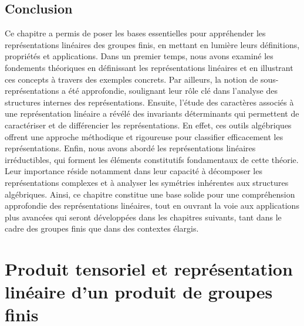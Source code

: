 \documentclass[a4paper, 14pt]{report}
\newcommand{\applyfontsize}{%
	\fontsize{12}{12}\selectfont
}
\begin{document}
\begin{onehalfspace}
{			\section*{Conclusion}
			Ce chapitre a permis de poser les bases essentielles pour appréhender les représentations linéaires des groupes finis, en mettant en lumière leurs définitions, propriétés et applications. Dans un premier temps, nous avons examiné les fondements théoriques en définissant les représentations linéaires et en illustrant ces concepts à travers des exemples concrets. Par ailleurs, la notion de sous-représentations a été approfondie, soulignant leur rôle clé dans l’analyse des structures internes des représentations.
			Ensuite, l’étude des caractères associés à une représentation linéaire a révélé des invariants déterminants qui permettent de caractériser et de différencier les représentations. En effet, ces outils algébriques offrent une approche méthodique et rigoureuse pour classifier efficacement les représentations.
			Enfin, nous avons abordé les représentations linéaires irréductibles, qui forment les éléments constitutifs fondamentaux de cette théorie. Leur importance réside notamment dans leur capacité à décomposer les représentations complexes et à analyser les symétries inhérentes aux structures algébriques.
			Ainsi, ce chapitre constitue une base solide pour une compréhension approfondie des représentations linéaires, tout en ouvrant la voie aux applications plus avancées qui seront développées dans les chapitres suivants, tant dans le cadre des groupes finis que dans des contextes élargis.
			
			
			
		}
		
		
		
		
		\chapter{Produit tensoriel et représentation linéaire d'un produit de groupes finis}
		{
			\applyfontsize %
			
}
\end{onehalfspace}
\end{document}
